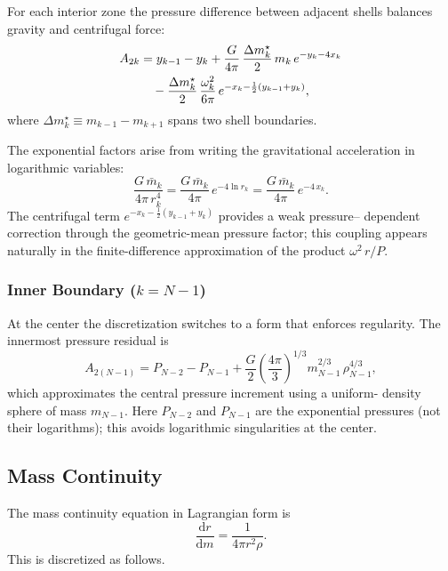 \documentclass{aastex631}
\newcommand{\dd}{\mathrm{d}}
\begin{document}
For each interior zone the pressure difference between adjacent shells
balances gravity and centrifugal force:
\begin{align}\label{eq:Ak_interior}
  A_{2k} &= y_{k-1} - y_k
           + \frac{G}{4\pi}\,\frac{\Delta m_k^{\star}}{2}\,m_k\,
             e^{-y_k - 4x_k}
           \notag\\
         &\quad
           - \frac{\Delta m_k^{\star}}{2}\,\frac{\omega_k^2}{6\pi}\,
             e^{-x_k - \frac{1}{2}(y_{k-1}+y_k)},
\end{align}
where $\Delta m_k^{\star} \equiv m_{k-1} - m_{k+1}$ spans two shell
boundaries.

The exponential factors arise from writing the gravitational
acceleration in logarithmic variables:
\begin{equation}
  \frac{G\,\bar{m}_k}{4\pi\,r_k^4}
  = \frac{G\,\bar{m}_k}{4\pi}\,e^{-4\ln r_k}
  = \frac{G\,\bar{m}_k}{4\pi}\,e^{-4\,x_k}.
\end{equation}
The centrifugal term
$e^{-x_k - \frac{1}{2}(y_{k-1}+y_k)}$ provides a weak pressure--%
dependent correction through the geometric-mean pressure factor; this
coupling appears naturally in the finite-difference approximation of the
product $\omega^2\,r/P$.

\subsubsection{Inner Boundary ($k=N-1$)}

At the center the discretization switches to a form that enforces
regularity.  The innermost pressure residual is
\begin{equation}\label{eq:AN}
  A_{2(N-1)} = P_{N-2} - P_{N-1}
              + \frac{G}{2}\left(\frac{4\pi}{3}\right)^{\!1/3}
                m_{N-1}^{2/3}\,\rho_{N-1}^{4/3},
\end{equation}
which approximates the central pressure increment using a uniform-%
density sphere of mass $m_{N-1}$.  Here $P_{N-2}$ and $P_{N-1}$ are
the exponential pressures (not their logarithms); this avoids
logarithmic singularities at the center.

\subsection{Mass Continuity}\label{sec:mass_cont}

The mass continuity equation in Lagrangian form is
\begin{equation}\label{eq:mass_cont}
  \frac{\dd r}{\dd m} = \frac{1}{4\pi r^2 \rho}.
\end{equation}
This is discretized as follows.
\end{document}
